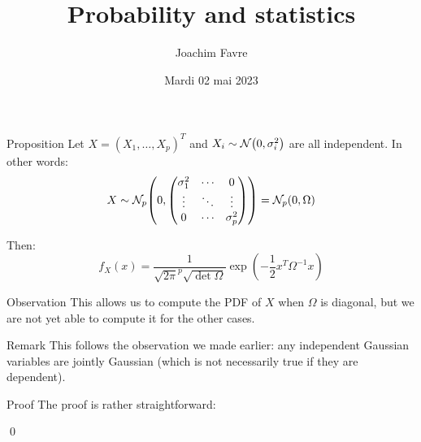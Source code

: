 \documentclass[a4paper]{article}
\title{Probability and statistics}
\author{Joachim Favre}
\date{Mardi 02 mai 2023}
\begin{document}
\maketitle


\begin{parag}{Proposition}
    Let $X = \left(X_1, \ldots, X_p\right)^T$ and $X_i \followsdistr \mathcal{N}\left(0, \sigma_i^2\right)$ are all independent. In other words:
    \[X \followsdistr \mathcal{N}_p\left(0, \begin{pmatrix} \sigma_1^2 & \cdots & 0 \\ \vdots & \ddots & \vdots \\ 0 & \cdots & \sigma_p^2 \end{pmatrix}\right) = \mathcal{N}_p\left(0, \Omega\right)\]

    Then:
    \[f_X\left(x\right) = \frac{1}{\sqrt{2\pi}^p \sqrt{\det \Omega}} \exp\left(-\frac{1}{2} x^T \Omega^{-1} x\right)\]
    
    \begin{subparag}{Observation}
        This allows us to compute the PDF of $X$ when $\Omega$ is diagonal, but we are not yet able to compute it for the other cases.
    \end{subparag}
    
    \begin{subparag}{Remark}
        This follows the observation we made earlier: any independent Gaussian variables are jointly Gaussian (which is not necessarily true if they are dependent).
    \end{subparag}

    \begin{subparag}{Proof}
        The proof is rather straightforward:

        \qed
    \end{subparag}
\end{parag}
\end{document}
